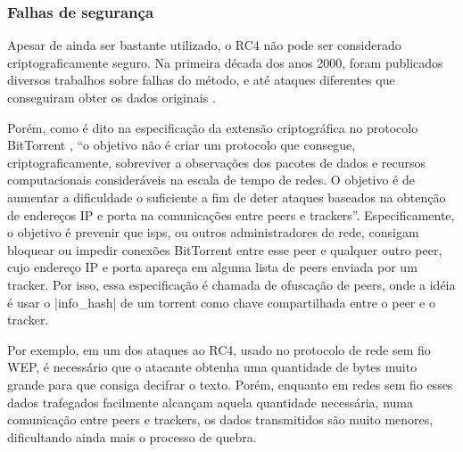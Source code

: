 
\subsubsection*{Falhas de segurança}

Apesar de ainda ser bastante utilizado, o RC4 não pode ser considerado
criptograficamente seguro. Na primeira década dos anos 2000, foram publicados diversos
trabalhos sobre falhas do método, e até ataques diferentes que conseguiram obter os
dados originais
\cite{blog:matthew-rc4-1,blog:matthew-rc4-2,blog:matthew-rc4-3,artigo:patterson}.

Porém, como é dito na especificação da extensão criptográfica no protocolo BitTorrent
\cite{site:bittorrent-cripto}, ``o objetivo não é criar um protocolo que consegue,
criptograficamente, sobreviver a observações dos pacotes de dados e recursos
computacionais consideráveis na escala de tempo de redes. O objetivo é de aumentar a
dificuldade o suficiente a fim de deter ataques baseados na obtenção de endereços IP e
porta na comunicações entre \glspl*{peer} e \glspl*{tracker}''. Especificamente, o
objetivo é prevenir que \glspl{isp}, ou outros administradores de rede, consigam
bloquear ou impedir conexões BitTorrent entre esse \gls*{peer} e qualquer outro
\gls*{peer}, cujo endereço IP e porta apareça em alguma lista de \glspl*{peer} enviada
por um \gls*{tracker}. Por isso, essa especificação é chamada de ofuscação de
\glspl*{peer}, onde a idéia é usar o \bverb|info_hash| de um \gls*{torrent} como chave
compartilhada entre o \gls*{peer} e o \gls*{tracker}.

Por exemplo, em um dos ataques ao RC4, usado no protocolo de rede sem fio WEP, é
necessário que o atacante obtenha uma quantidade de bytes muito grande para que consiga
decifrar o texto. Porém, enquanto em redes sem fio esses dados trafegados facilmente
alcançam aquela quantidade necessária, numa comunicação entre \glspl*{peer} e
\glspl*{tracker}, os dados transmitidos são muito menores, dificultando ainda mais o
processo de quebra.